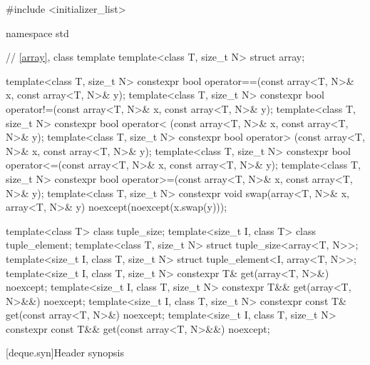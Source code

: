 %
\begin{codeblock}
#include <initializer_list>

namespace std {
  // \ref{array}, class template 
  template<class T, size_t N> struct array;

  template<class T, size_t N>
    constexpr bool operator==(const array<T, N>& x, const array<T, N>& y);
  template<class T, size_t N>
    constexpr bool operator!=(const array<T, N>& x, const array<T, N>& y);
  template<class T, size_t N>
    constexpr bool operator< (const array<T, N>& x, const array<T, N>& y);
  template<class T, size_t N>
    constexpr bool operator> (const array<T, N>& x, const array<T, N>& y);
  template<class T, size_t N>
    constexpr bool operator<=(const array<T, N>& x, const array<T, N>& y);
  template<class T, size_t N>
    constexpr bool operator>=(const array<T, N>& x, const array<T, N>& y);
  template<class T, size_t N>
    constexpr void swap(array<T, N>& x, array<T, N>& y) noexcept(noexcept(x.swap(y)));

  template<class T> class tuple_size;
  template<size_t I, class T> class tuple_element;
  template<class T, size_t N>
    struct tuple_size<array<T, N>>;
  template<size_t I, class T, size_t N>
    struct tuple_element<I, array<T, N>>;
  template<size_t I, class T, size_t N>
    constexpr T& get(array<T, N>&) noexcept;
  template<size_t I, class T, size_t N>
    constexpr T&& get(array<T, N>&&) noexcept;
  template<size_t I, class T, size_t N>
    constexpr const T& get(const array<T, N>&) noexcept;
  template<size_t I, class T, size_t N>
    constexpr const T&& get(const array<T, N>&&) noexcept;
}
\end{codeblock}

[deque.syn]{Header  synopsis}

%

